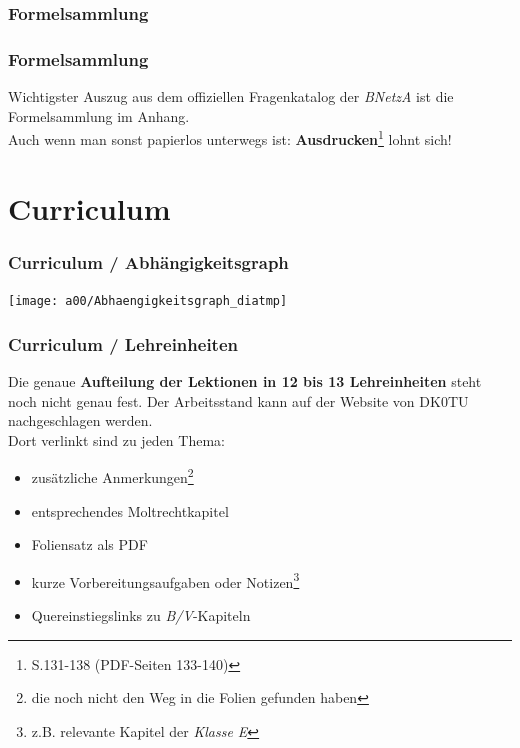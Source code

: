\subsubsection{Formelsammlung}

\begin{frame}
    \frametitle{Formelsammlung}

    Wichtigster Auszug aus dem offiziellen Fragenkatalog der \emph{BNetzA} ist
    die Formelsammlung im Anhang. \\[3em]

    Auch wenn man sonst papierlos unterwegs ist:
    \textbf{Ausdrucken}\footnote{S.131-138 (PDF-Seiten 133-140)} lohnt sich!

\end{frame}

\section{Curriculum}

\begin{frame}
    \frametitle{Curriculum / Abhängigkeitsgraph}

    \texttt{[image: a00/Abhaengigkeitsgraph\_diatmp]}

\end{frame}

\begin{frame}
    \frametitle{Curriculum / Lehreinheiten}

    Die genaue \textbf{Aufteilung der Lektionen in 12 bis 13 Lehreinheiten}
    steht noch nicht genau fest. Der Arbeitsstand kann auf der Website von
    DK0TU\hyperlink{refs}{\cite{curr}} nachgeschlagen werden. \\[2em]

    Dort verlinkt sind zu jeden Thema:

    \begin{itemize}
        \item zusätzliche Anmerkungen\footnote{die noch nicht den Weg in die
              Folien gefunden haben}
        \item entsprechendes Moltrechtkapitel
        \item Foliensatz als PDF
        \item kurze Vorbereitungsaufgaben oder Notizen\footnote{z.B. relevante
              Kapitel der \emph{Klasse E}}
        \item Quereinstiegslinks zu \emph{B/V}-Kapiteln
    \end{itemize}

\end{frame}


